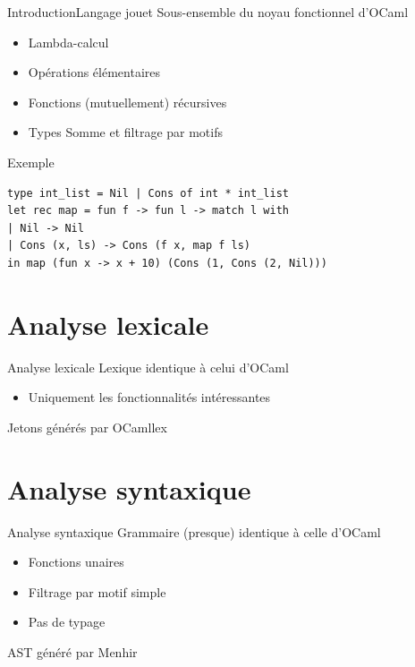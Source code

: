 \documentclass{beamer}
\begin{document}
\begin{frame}[fragile]{Introduction}{Langage jouet}
    Sous-ensemble du noyau fonctionnel d'OCaml

    \begin{itemize}
        \item Lambda-calcul
        \item Opérations élémentaires
        \item Fonctions (mutuellement) récursives
        \item Types Somme et filtrage par motifs
    \end{itemize}

    \begin{exampleblock}{Exemple}
        \begin{lstlisting}[language=caml]
type int_list = Nil | Cons of int * int_list
let rec map = fun f -> fun l -> match l with
| Nil -> Nil
| Cons (x, ls) -> Cons (f x, map f ls)
in map (fun x -> x + 10) (Cons (1, Cons (2, Nil)))
        \end{lstlisting}
    \end{exampleblock}
\end{frame}

\section{Analyse lexicale}

\begin{frame}{Analyse lexicale}
    Lexique identique à celui d'OCaml

    \begin{itemize}
        \item Uniquement les fonctionnalités intéressantes
    \end{itemize}

    Jetons générés par OCamllex
\end{frame}

\section{Analyse syntaxique}

\begin{frame}{Analyse syntaxique}
    Grammaire (presque) identique à celle d'OCaml

    \begin{itemize}
        \item Fonctions unaires
        \item Filtrage par motif simple
        \item Pas de typage
    \end{itemize}

    AST généré par Menhir
\end{frame}
\end{document}
